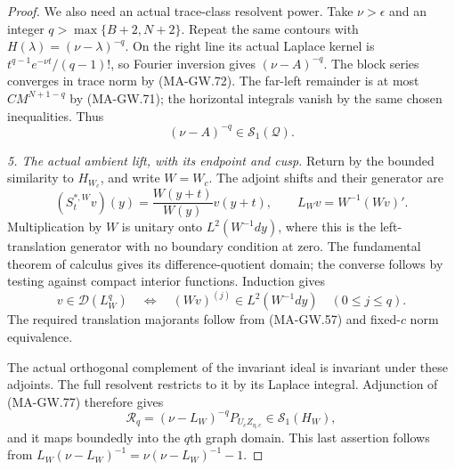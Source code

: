 \begin{proof}
We also need an actual trace-class resolvent power.
Take \(\nu>\epsilon\) and an integer
\(q>\max\{B+2,N+2\}\).  Repeat the same contours with
\(H(\lambda)=(\nu-\lambda)^{-q}\).
On the right line its actual Laplace kernel is
\(t^{q-1}e^{-\nu t}/(q-1)!\), so Fourier inversion gives
\((\nu-A)^{-q}\).
The block series converges in trace norm by (MA-GW.72).
The far-left remainder is at most
\(CM^{N+1-q}\) by (MA-GW.71); the horizontal integrals
vanish by the same chosen inequalities.
Thus
\[
                            (\nu-A)^{-q}\in\mathcal S_1(\mathcal Q).
 \tag{MA-GW.77}
\]

\emph{5. The actual ambient lift, with its endpoint and cusp.}
Return by the bounded similarity to \(H_{W_c}\), and
write \(W=W_c\).  The adjoint shifts and their generator are
\[
 (S_t^{*,W}v)(y)=\frac{W(y+t)}{W(y)}v(y+t),\qquad
 L_Wv=W^{-1}(Wv)' .
\]
Multiplication by \(W\) is unitary onto \(L^2(W^{-1}dy)\),
where this is the left-translation generator with no
boundary condition at zero.  The fundamental theorem of
calculus gives its difference-quotient domain; the converse
follows by testing against compact interior functions.
Induction gives
\[
 v\in\mathcal D(L_W^q)
 \quad\Longleftrightarrow\quad
 (Wv)^{(j)}\in L^2(W^{-1}dy)\quad(0\le j\le q).
 \tag{MA-GW.78}
\]
The required translation majorants follow from (MA-GW.57)
and fixed-\(c\) norm equivalence.

The actual orthogonal complement of the invariant ideal
is invariant under these adjoints.
The full resolvent restricts to it by its Laplace integral.
Adjunction of (MA-GW.77) therefore gives
\[
 \mathcal R_q=(\nu-L_W)^{-q}P_{U_cZ_{\eta,c}}
                   \in\mathcal S_1(H_W),
 \tag{MA-GW.79}
\]
and it maps boundedly into the \(q\)th graph domain.
This last assertion follows from
\(L_W(\nu-L_W)^{-1}=\nu(\nu-L_W)^{-1}-1\).


\end{proof}
